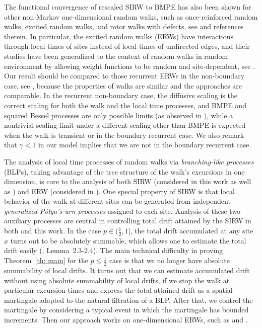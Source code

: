 \documentclass[EJP]{ejpecp} %
\begin{document}
The functional convergence of rescaled SIRW to BMPE has also been shown for other non-Markov one-dimensional random walks,
such as once-reinforced random walks, excited random walks, and rotor walks with defects, see \cite{Dav96,Dav99,DK12,KP16,KMP22,HLSH18} and references therein. 
In particular, the excited random walks (ERWs) have interactions through local times of sites instead of local times of undirected edges, and their studies have been generalized to the context of random walks in random environment by allowing weight functions to be random and site-dependent, 
see \cite{KZ13, KMP22}.
Our result should be compared to those recurrent ERWs in the non-boundary case, see \cite{KP16,KMP23}, because the properties of walks are similar and the approaches are comparable. 
In the recurrent non-boundary case, the diffusive scaling is the correct scaling for both the walk and the local time processes, and BMPE and squared Bessel processes are only possible limits (as observed in \cite{T96}), while a nontrivial scaling limit under a different scaling other than BMPE is expected when the walk is transient or in the boundary recurrent case. We also remark that $\gamma<1$ in our model implies that we are not in the boundary recurrent case.


The analysis of local time processes of random walks via \textit{branching-like processes} (BLPs), taking advantage of the tree structure of the walk's excursions in one dimension, is core to the analysis of both SIRW (considered in this work as well as \cite{T96, KMP23}) and ERW (considered in \cite{DK12, KP16, KMP22}). 
One special property of SIRW is that local behavior of the walk at different sites can be generated from independent \textit{generalized P\'olya's urn processes} assigned to each site.
Analysis of these two auxiliary processes are central in controlling total drift attained by the SIRW in both \cite{KMP23} and this work.
In the case $p \in (\frac{1}{2}, 1]$, the total drift accumulated at any site $x$ turns out to be absolutely summable, which allows one to estimate the total drift easily (\cite{KMP23}, Lemma~2.3-2.4).
The main technical difficulty in proving Theorem~\ref{th: main} for the $p \le \frac{1}{2}$ case is that we no longer have absolute summability of local drifts.
It turns out that we can estimate accumulated drift without using absolute summability of local drifts, if we stop the walk at particular excursion times and express the total attained drift as a spatial martingale adapted to the natural filtration of a BLP. After that, we control the martingale by considering a typical event in which the martingale has bounded increments.
Then our approach works on one-dimensional ERWs, such as \cite{DK12} and \cite{KP16}.
\end{document}
